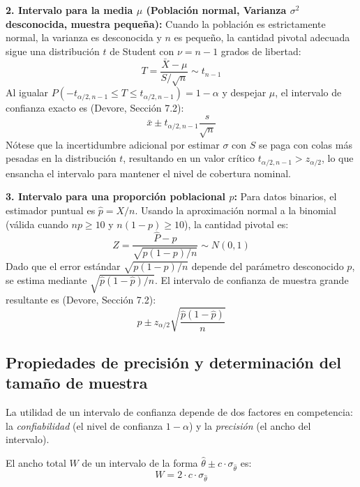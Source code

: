 \textbf{2. Intervalo para la media $\mu$ (Población normal, Varianza $\sigma^2$ desconocida, muestra pequeña):}
Cuando la población es estrictamente normal, la varianza es desconocida y $n$ es pequeño, la cantidad pivotal adecuada sigue una distribución $t$ de Student con $\nu = n-1$ grados de libertad:
$$ T = \frac{\bar{X} - \mu}{S / \sqrt{n}} \sim t_{n-1} $$
Al igualar $P(-t_{\alpha/2, n-1} \le T \le t_{\alpha/2, n-1}) = 1 - \alpha$ y despejar $\mu$, el intervalo de confianza exacto es (Devore, Sección 7.2):
$$ \bar{x} \pm t_{\alpha/2, n-1} \frac{s}{\sqrt{n}} $$
Nótese que la incertidumbre adicional por estimar $\sigma$ con $S$ se paga con colas más pesadas en la distribución $t$, resultando en un valor crítico $t_{\alpha/2, n-1} > z_{\alpha/2}$, lo que ensancha el intervalo para mantener el nivel de cobertura nominal.

\textbf{3. Intervalo para una proporción poblacional $p$:}
Para datos binarios, el estimador puntual es $\hat{p} = X/n$. Usando la aproximación normal a la binomial (válida cuando $np \ge 10$ y $n(1-p) \ge 10$), la cantidad pivotal es:
$$ Z = \frac{\hat{P} - p}{\sqrt{p(1-p)/n}} \sim N(0, 1) $$
Dado que el error estándar $\sqrt{p(1-p)/n}$ depende del parámetro desconocido $p$, se estima mediante $\sqrt{\hat{p}(1-\hat{p})/n}$. El intervalo de confianza de muestra grande resultante es (Devore, Sección 7.2):
$$ \hat{p} \pm z_{\alpha/2} \sqrt{\frac{\hat{p}(1-\hat{p})}{n}} $$

\subsection{Propiedades de precisión y determinación del tamaño de muestra}

La utilidad de un intervalo de confianza depende de dos factores en competencia: la \textit{confiabilidad} (el nivel de confianza $1-\alpha$) y la \textit{precisión} (el ancho del intervalo). 

El ancho total $W$ de un intervalo de la forma $\hat{\theta} \pm c \cdot \sigma_{\hat{\theta}}$ es:
$$ W = 2 \cdot c \cdot \sigma_{\hat{\theta}} $$

